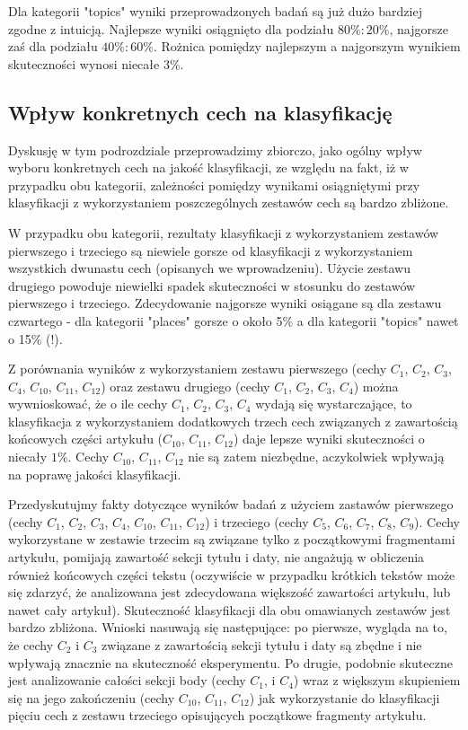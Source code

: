 \documentclass{classrep}
\begin{document}
Dla kategorii "topics" wyniki przeprowadzonych badań są już dużo bardziej zgodne z intuicją. Najlepsze wyniki osiągnięto dla podziału $80\%:20\%$, najgorsze zaś dla podziału $40\%:60\%$. Rożnica pomiędzy najlepszym a najgorszym wynikiem skuteczności wynosi niecałe $3\%$.

\subsection{Wpływ konkretnych cech na klasyfikację}
Dyskusję w tym podrozdziale przeprowadzimy zbiorczo, jako ogólny wpływ wyboru konkretnych cech na jakość klasyfikacji, ze względu na fakt, iż w przypadku obu kategorii, zależności pomiędzy wynikami osiągniętymi przy klasyfikacji z wykorzystaniem poszczególnych zestawów cech są bardzo zbliżone.\newline

W przypadku obu kategorii, rezultaty klasyfikacji z wykorzystaniem zestawów pierwszego i trzeciego są niewiele gorsze od klasyfikacji z wykorzystaniem wszystkich dwunastu cech (opisanych we wprowadzeniu). Użycie zestawu drugiego powoduje niewielki spadek skuteczności w stosunku do zestawów pierwszego i trzeciego. Zdecydowanie najgorsze wyniki osiągane są dla zestawu czwartego - dla kategorii "places" gorsze o około 5\% a dla kategorii "topics" nawet o 15\% (!). \newline

Z porównania wyników z wykorzystaniem zestawu pierwszego (cechy $C_{1}$,  $C_{2}$,  $C_{3}$,  $C_{4}$,  $C_{10}$,  $C_{11}$,  $C_{12}$) oraz zestawu drugiego (cechy $C_{1}$,  $C_{2}$,  $C_{3}$,  $C_{4}$) można wywnioskować, że o ile cechy $C_{1}$,  $C_{2}$,  $C_{3}$,  $C_{4}$ wydają się wystarczające, to klasyfikacja z wykorzystaniem dodatkowych trzech cech związanych z zawartością końcowych części artykułu ($C_{10}$,  $C_{11}$,  $C_{12}$) daje lepsze wyniki skuteczności o niecały $1\%$. Cechy $C_{10}$,  $C_{11}$,  $C_{12}$ nie są zatem niezbędne, aczykolwiek wpływają na poprawę jakości klasyfikacji.\newline

Przedyskutujmy fakty dotyczące wyników badań z użyciem zastawów pierwszego (cechy $C_{1}$,  $C_{2}$,  $C_{3}$,  $C_{4}$,  $C_{10}$,  $C_{11}$,  $C_{12}$) i trzeciego (cechy $C_{5}$,  $C_{6}$,  $C_{7}$,  $C_{8}$,  $C_{9}$). Cechy wykorzystane w zestawie trzecim są związane tylko z początkowymi fragmentami artykułu, pomijają zawartość sekcji tytułu i daty, nie angażują w obliczenia również końcowych części tekstu (oczywiście w przypadku krótkich tekstów może się zdarzyć, że analizowana jest zdecydowana większość zawartości artykułu, lub nawet cały artykuł). Skuteczność klasyfikacji dla obu omawianych zestawów jest bardzo zbliżona. Wnioski nasuwają się następujące: po pierwsze, wygląda na to, że cechy $C_{2}$ i $C_{3}$ związane z zawartością sekcji tytułu i daty są zbędne i nie wpływają znacznie na skuteczność eksperymentu. Po drugie, podobnie skuteczne jest analizowanie całości sekcji body (cechy  $C_{1}$, i $C_{4}$) wraz z większym skupieniem się na jego zakończeniu (cechy $C_{10}$,  $C_{11}$,  $C_{12}$) jak wykorzystanie do klasyfikacji pięciu cech z zestawu trzeciego opisujących początkowe fragmenty artykułu. \newline
\end{document}
